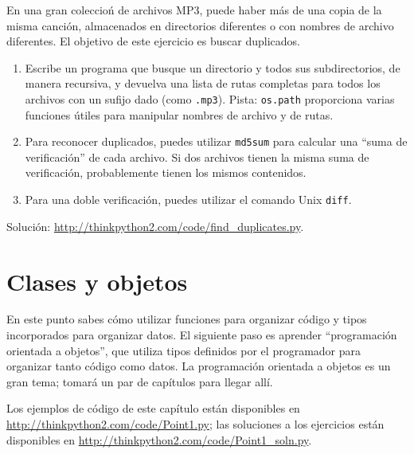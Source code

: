 \documentclass[10pt]{book}
\begin{document}
\begin{exercise}
\label{checksum}

En una gran coleccioń de archivos MP3, puede haber más de una
copia de la misma canción, almacenados en directorios diferentes o con
nombres de archivo diferentes.  El objetivo de este ejercicio es buscar
duplicados.

\begin{enumerate}

\item Escribe un programa que busque un directorio y todos sus
subdirectorios, de manera recursiva, y devuelva una lista de rutas completas
para todos los archivos con un sufijo dado (como {\tt .mp3}).
Pista: {\tt os.path} proporciona varias funciones útiles para
manipular nombres de archivo y de rutas.

\item Para reconocer duplicados, puedes utilizar {\tt md5sum}
para calcular una ``suma de verificación'' de cada archivo.  Si dos archivos tienen
la misma suma de verificación, probablemente tienen los mismos contenidos.

\item Para una doble verificación, puedes utilizar el comando Unix {\tt diff}.

\end{enumerate}

Solución: \url{http://thinkpython2.com/code/find_duplicates.py}.

\end{exercise}



\chapter{Clases y objetos}
\label{clobjects}

En este punto sabes cómo utilizar
funciones para organizar código y
tipos incorporados para organizar datos.  El siguiente paso es aprender
``programación orientada a objetos'', que utiliza tipos definidos por el programador
para organizar tanto código como datos.  La programación orientada a objetos es
un gran tema; tomará un par de capítulos para llegar allí.

Los ejemplos de código de este capítulo están disponibles en
\url{http://thinkpython2.com/code/Point1.py}; las soluciones
a los ejercicios están disponibles en
\url{http://thinkpython2.com/code/Point1_soln.py}.
\end{document}
